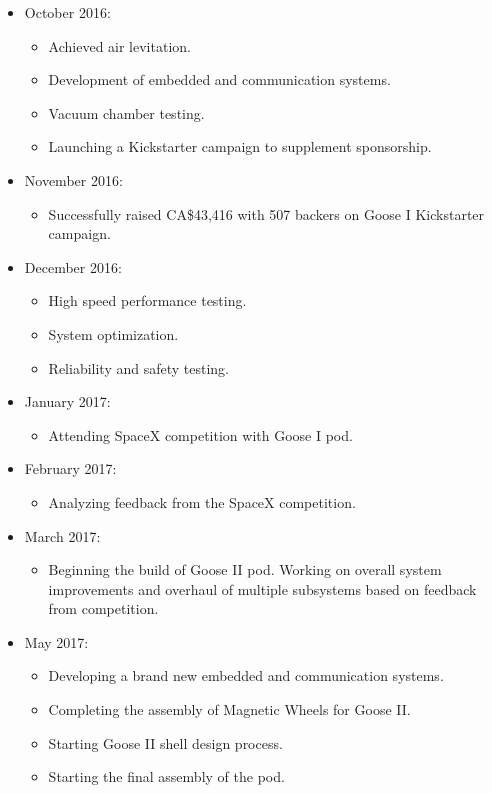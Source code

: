 \documentclass[main.tex]{subfiles}
\begin{document}
\begin{itemize}
\item October 2016:
\begin{itemize}
    \item Achieved air levitation.
    \item Development of embedded and communication systems.
    \item Vacuum chamber testing.
    \item Launching a Kickstarter campaign to supplement sponsorship.
\end{itemize}

\item November 2016:
\begin{itemize}
    \item Successfully raised CA\$43,416 with 507 backers on Goose I Kickstarter campaign.
\end{itemize}

\item December 2016:
\begin{itemize}
    \item High speed performance testing.
    \item System optimization.
    \item Reliability and safety testing.
\end{itemize}

\item January 2017:
\begin{itemize}
    \item Attending SpaceX competition with Goose I pod.
\end{itemize}

\item February 2017:
\begin{itemize}
    \item Analyzing feedback from the SpaceX competition.
\end{itemize}

\item March 2017:
\begin{itemize}
    \item Beginning the build of Goose II pod. Working on overall system improvements and overhaul of multiple subsystems based on feedback from competition.
\end{itemize}

\item May 2017:
\begin{itemize}
    \item Developing a brand new embedded and communication systems.
    \item Completing the assembly of Magnetic Wheels for Goose II.
    \item Starting Goose II shell design process.
    \item Starting the final assembly of the pod.
\end{itemize}


\end{itemize}
\end{document}
